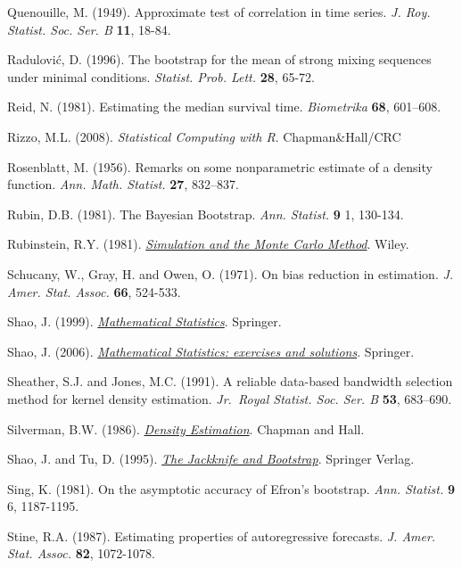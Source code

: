 \documentclass[
]{book}
\theoremstyle{break}
\theoremstyle{definition}
\theoremstyle{definition}
\theoremstyle{definition}
\theoremstyle{remark}
\begin{document}
Quenouille, M. (1949). Approximate test of correlation in time series.
\emph{J. Roy. Statist. Soc. Ser. B} \textbf{11}, 18-84.

Radulović, D. (1996). The bootstrap for the mean of strong mixing
sequences under minimal conditions. \emph{Statist. Prob. Lett.} \textbf{28},
65-72.

Reid, N. (1981). Estimating the median survival time. \emph{Biometrika}
\textbf{68}, 601--608.

Rizzo, M.L. (2008). \emph{Statistical Computing with R}. Chapman\&Hall/CRC

Rosenblatt, M. (1956). Remarks on some nonparametric estimate of a
density function. \emph{Ann. Math. Statist.} \textbf{27}, 832--837.

Rubin, D.B. (1981). The Bayesian Bootstrap. \emph{Ann. Statist.} \textbf{9} 1,
130-134.

Rubinstein, R.Y. (1981). \href{https://books.google.es/books?hl=es\&lr=\&id=r2VODQAAQBAJ\&oi=fnd\&pg=PR1\&dq=Simulation+and+the+Monte+Carlo+Method}{\emph{Simulation and the Monte Carlo Method}}. Wiley.

Schucany, W., Gray, H. and Owen, O. (1971). On bias reduction in
estimation. \emph{J. Amer. Stat. Assoc.} \textbf{66}, 524-533.

Shao, J. (1999). \href{https://www.springer.com/gp/book/9780387953823}{\emph{Mathematical Statistics}}. Springer.

Shao, J. (2006). \href{http://www.stewartschultz.com/statistics/books/Mathematical\%20Statistics\%20-\%20Exercises\%20and\%20Solutions.pdf}{\emph{Mathematical Statistics: exercises and solutions}}. Springer.

Sheather, S.J. and Jones, M.C. (1991). A reliable data-based bandwidth
selection method for kernel density estimation.
\emph{Jr.~Royal Statist. Soc. Ser. B} \textbf{53}, 683--690.

Silverman, B.W. (1986). \href{http://users.stat.ufl.edu/~rrandles/sta6934/smhandout.pdf}{\emph{Density Estimation}}. Chapman and Hall.

Shao, J. and Tu, D. (1995). \href{https://books.google.es/books?hl=es\&lr=\&id=VO3SBwAAQBAJ\&oi=fnd\&pg=PA1\&dq=The+Jackknife+and+Bootstrap}{\emph{The Jackknife and Bootstrap}}. Springer Verlag.

Sing, K. (1981). On the asymptotic accuracy of Efron's bootstrap.
\emph{Ann. Statist.} \textbf{9} 6, 1187-1195.

Stine, R.A. (1987). Estimating properties of autoregressive forecasts.
\emph{J. Amer. Stat. Assoc.} \textbf{82}, 1072-1078.
\end{document}

